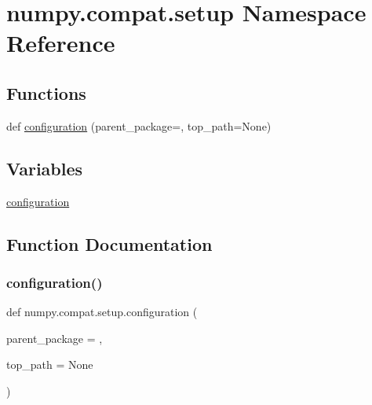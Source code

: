\hypertarget{namespacenumpy_1_1compat_1_1setup}{}\section{numpy.\+compat.\+setup Namespace Reference}
\label{namespacenumpy_1_1compat_1_1setup}
\subsection*{Functions}
\begin{DoxyCompactItemize}
\item 
def \hyperlink{namespacenumpy_1_1compat_1_1setup_ab7440bbc111c6edf2e80588591178721}{configuration} (parent\+\_\+package=\textquotesingle{}\textquotesingle{}, top\+\_\+path=None)
\end{DoxyCompactItemize}
\subsection*{Variables}
\begin{DoxyCompactItemize}
\item 
\hyperlink{namespacenumpy_1_1compat_1_1setup_a26fae5132bec7a030f538974684e3819}{configuration}
\end{DoxyCompactItemize}


\subsection{Function Documentation}
\mbox{\label{namespacenumpy_1_1compat_1_1setup_ab7440bbc111c6edf2e80588591178721}} 
\subsubsection{\texorpdfstring{configuration()}{configuration()}}
{\footnotesize\ttfamily def numpy.\+compat.\+setup.\+configuration (\begin{DoxyParamCaption}\item[{}]{parent\+\_\+package = {\ttfamily \textquotesingle{}\textquotesingle{}},  }\item[{}]{top\+\_\+path = {\ttfamily None} }\end{DoxyParamCaption})}



